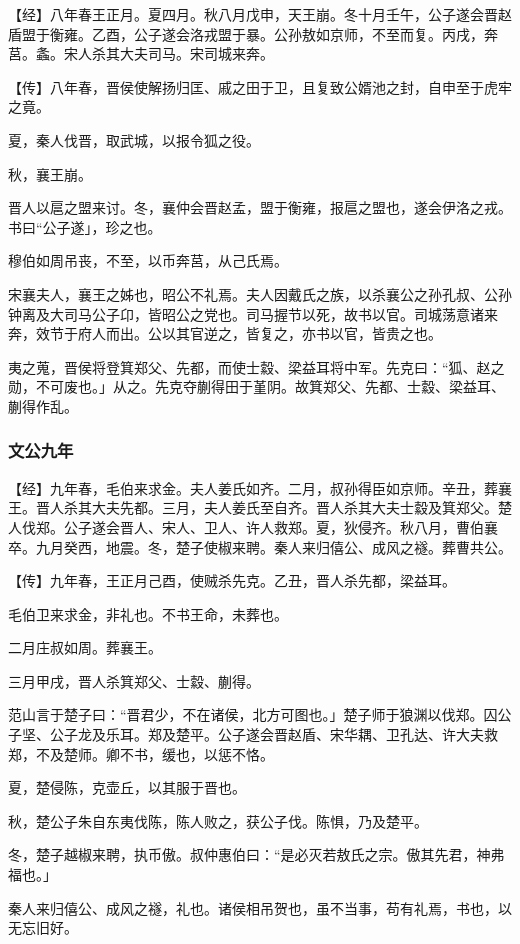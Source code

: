 \documentclass[]{article}
\begin{document}
【经】八年春王正月。夏四月。秋八月戊申，天王崩。冬十月壬午，公子遂会晋赵盾盟于衡雍。乙酉，公子遂会洛戎盟于暴。公孙敖如京师，不至而复。丙戌，奔莒。螽。宋人杀其大夫司马。宋司城来奔。

【传】八年春，晋侯使解扬归匡、戚之田于卫，且复致公婿池之封，自申至于虎牢之竟。

夏，秦人伐晋，取武城，以报令狐之役。

秋，襄王崩。

晋人以扈之盟来讨。冬，襄仲会晋赵孟，盟于衡雍，报扈之盟也，遂会伊洛之戎。书曰``公子遂」，珍之也。

穆伯如周吊丧，不至，以币奔莒，从己氏焉。

宋襄夫人，襄王之姊也，昭公不礼焉。夫人因戴氏之族，以杀襄公之孙孔叔、公孙钟离及大司马公子卬，皆昭公之党也。司马握节以死，故书以官。司城荡意诸来奔，效节于府人而出。公以其官逆之，皆复之，亦书以官，皆贵之也。

夷之蒐，晋侯将登箕郑父、先都，而使士縠、梁益耳将中军。先克曰：``狐、赵之勋，不可废也。」从之。先克夺蒯得田于堇阴。故箕郑父、先都、士縠、梁益耳、蒯得作乱。

\hypertarget{header-n1149}{%
\subsubsection{文公九年}\label{header-n1149}}

【经】九年春，毛伯来求金。夫人姜氏如齐。二月，叔孙得臣如京师。辛丑，葬襄王。晋人杀其大夫先都。三月，夫人姜氏至自齐。晋人杀其大夫士縠及箕郑父。楚人伐郑。公子遂会晋人、宋人、卫人、许人救郑。夏，狄侵齐。秋八月，曹伯襄卒。九月癸西，地震。冬，楚子使椒来聘。秦人来归僖公、成风之襚。葬曹共公。

【传】九年春，王正月己酉，使贼杀先克。乙丑，晋人杀先都，梁益耳。

毛伯卫来求金，非礼也。不书王命，未葬也。

二月庄叔如周。葬襄王。

三月甲戌，晋人杀箕郑父、士縠、蒯得。

范山言于楚子曰：``晋君少，不在诸侯，北方可图也。」楚子师于狼渊以伐郑。囚公子坚、公子龙及乐耳。郑及楚平。公子遂会晋赵盾、宋华耦、卫孔达、许大夫救郑，不及楚师。卿不书，缓也，以惩不恪。

夏，楚侵陈，克壶丘，以其服于晋也。

秋，楚公子朱自东夷伐陈，陈人败之，获公子伐。陈惧，乃及楚平。

冬，楚子越椒来聘，执币傲。叔仲惠伯曰：``是必灭若敖氏之宗。傲其先君，神弗福也。」

秦人来归僖公、成风之襚，礼也。诸侯相吊贺也，虽不当事，苟有礼焉，书也，以无忘旧好。
\end{document}
